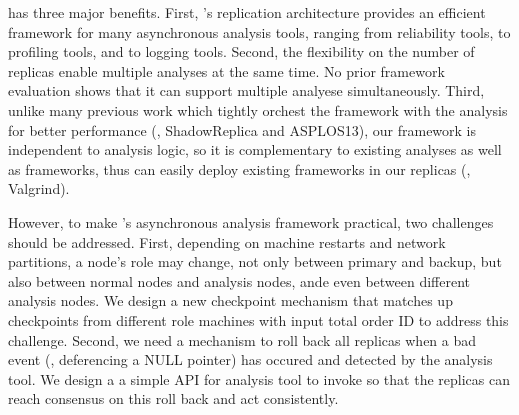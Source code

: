 \xxx has three major benefits. First, \xxx's replication architecture provides 
an efficient framework for many asynchronous analysis tools, ranging from 
reliability tools, to profiling tools, and to logging tools. Second, the 
flexibility on the number of replicas enable multiple analyses at the same 
time. No prior framework evaluation shows that it can support multiple analyese 
simultaneously. Third, unlike many previous work which tightly orchest the 
framework with the analysis for better performance (\eg, ShadowReplica and 
ASPLOS13), our framework is independent to analysis logic, so it is 
complementary to existing analyses as well as frameworks, thus \xxx can easily 
deploy existing frameworks in our replicas (\eg, Valgrind).


However, to make \xxx's asynchronous analysis framework practical, two 
challenges should be addressed. First, depending on machine restarts and 
network partitions, a node's role may change, not only between primary and 
backup, but also between normal nodes and analysis nodes, ande even between 
different analysis nodes. We design a new checkpoint mechanism that matches up 
checkpoints from different role machines with input total order ID to address 
this challenge. Second, we need a mechanism to roll back all replicas when a 
bad event (\eg, deferencing a NULL pointer) has occured and detected by the 
analysis tool. We design a a simple API for analysis tool to invoke so that the 
replicas can reach consensus on this roll back and act consistently.






